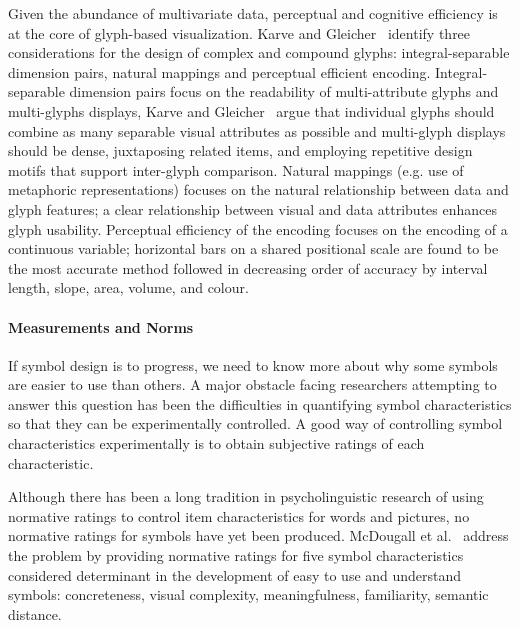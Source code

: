 Given the abundance of multivariate data, perceptual and cognitive efficiency is at the core of glyph-based visualization. 
Karve and Gleicher~\cite{Karve07} identify three considerations for the design of complex and compound glyphs: integral-separable dimension pairs, natural mappings and perceptual efficient encoding.
Integral-separable dimension pairs focus on the readability of multi-attribute glyphs and multi-glyphs displays, Karve and Gleicher~\cite{Karve07} argue that individual glyphs should combine as many separable visual attributes as possible and multi-glyph displays should be dense, juxtaposing related items, and employing repetitive design motifs that support inter-glyph comparison.
Natural mappings (e.g. use of metaphoric representations) focuses on the natural relationship between data and glyph features; a clear relationship between visual and data attributes enhances glyph usability.
Perceptual efficiency of the encoding focuses on the encoding of a continuous variable; horizontal bars on a shared positional scale are found to be the most accurate method followed in decreasing order of accuracy by interval length, slope, area, volume, and colour.  

\paragraph{Measurements and Norms}


If symbol design is to progress, we need
to know more about why some symbols are easier to use
than others.
A major obstacle facing researchers attempting to answer this question has been the difficulties in quantifying
symbol characteristics so that they can be experimentally controlled. A good way of controlling symbol characteristics
experimentally is to obtain subjective ratings of each characteristic.

Although there has been a long tradition
in psycholinguistic research of using normative ratings
to control item characteristics for words and pictures, no normative ratings for symbols have yet been
produced.
McDougall et al.~\cite{Mcdougall1999,Mcdougall2000} address the problem by providing normative ratings for five
symbol characteristics considered determinant in the development of easy to use and understand symbols: 
concreteness, visual complexity, meaningfulness, familiarity, semantic distance.

